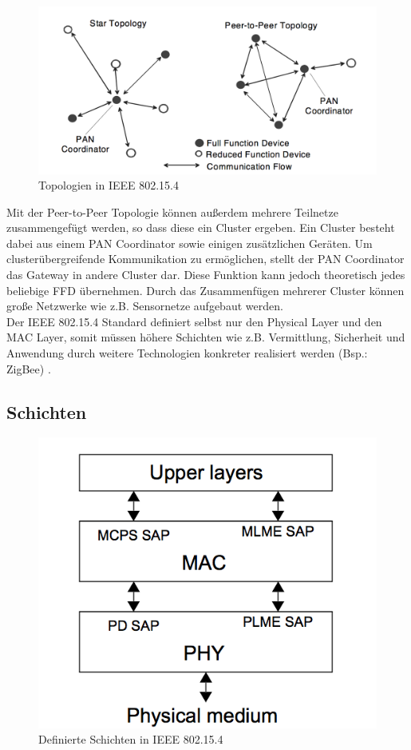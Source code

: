 \begin{figure}[H] 
	\centering
	\includegraphics[scale=0.5]{Bilder/topologies}
	\caption{Topologien in IEEE 802.15.4\cite{d:ieee}}
	\label{f:topologies}
\end{figure}

Mit der Peer-to-Peer Topologie können außerdem mehrere Teilnetze zusammengefügt werden, so dass diese ein Cluster ergeben. Ein Cluster besteht dabei aus einem PAN Coordinator sowie einigen zusätzlichen Geräten. Um clusterübergreifende Kommunikation zu ermöglichen, stellt der PAN Coordinator das Gateway in andere Cluster dar. Diese Funktion kann jedoch theoretisch jedes beliebige FFD übernehmen. Durch das Zusammenfügen mehrerer Cluster können große Netzwerke wie z.B. Sensornetze aufgebaut werden. \\
Der IEEE 802.15.4 Standard definiert selbst nur den Physical Layer und den MAC Layer, somit müssen höhere Schichten wie z.B. Vermittlung, Sicherheit und Anwendung durch weitere Technologien konkreter realisiert werden (Bsp.: ZigBee) \cite{d:hesse} \cite{d:ieee}.

\subsection{Schichten}\label{ss:Schichten}

\begin{figure}[H] 
	\centering
	\includegraphics[scale=0.8]{Bilder/schichten}
	\caption{Definierte Schichten in IEEE 802.15.4\cite{d:ieee}}
	\label{f:schichten}
\end{figure}

